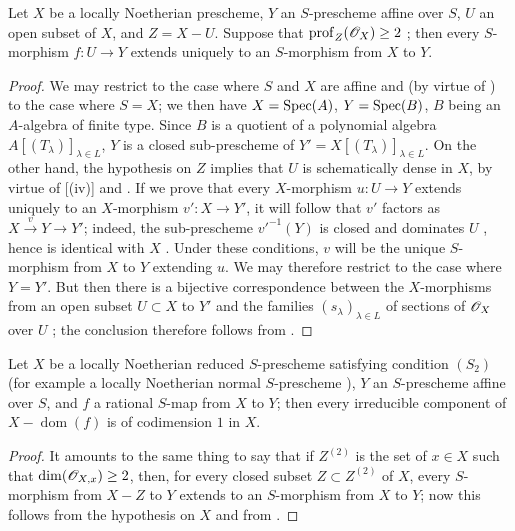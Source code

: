 \begin{proposition}[20.4.11]
\label{IV.20.4.11}
Let $X$ be a locally Noetherian prescheme, $Y$ an $S$-prescheme affine over $S$, $U$ an open subset of $X$, and $Z=X-U$.
Suppose that $\operatorname{prof}_Z(\mathscr{O}_X)\geq 2$ ; then every $S$-morphism $f:U\to Y$ extends uniquely to an $S$-morphism from $X$ to $Y$.
\end{proposition}

\begin{proof}
We may restrict to the case where $S$ and $X$ are affine and (by virtue of ) to the case where $S=X$; we then have $X=\operatorname{Spec}(A)$, $Y=\operatorname{Spec}(B)$, $B$ being an $A$-algebra of finite type.
Since $B$ is a quotient of a polynomial algebra $A[(T_\lambda)]_{\lambda\in L}$, $Y$ is a closed sub-prescheme of $Y'=X[(T_\lambda)]_{\lambda\in L}$.
On the other hand, the hypothesis on $Z$ implies that $U$ is schematically dense in $X$, by virtue of [(iv)] and .
If we prove that every $X$-morphism $u:U\to Y$ extends uniquely to an $X$-morphism $v':X\to Y'$, it will follow that $v'$ factors as $X\xrightarrow{v}Y\to Y'$; indeed, the sub-prescheme $v'^{-1}(Y)$ is closed and dominates $U$ , hence is identical with $X$ .
Under these conditions, $v$ will be the unique $S$-morphism from $X$ to $Y$ extending $u$.
We may therefore restrict to the case where $Y=Y'$.
But then there is a bijective correspondence between the $X$-morphisms from an open subset $U\subset X$ to $Y'$ and the families $(s_\lambda)_{\lambda\in L}$ of sections of $\mathscr{O}_X$ over $U$ ; the conclusion therefore follows from .
\end{proof}

\begin{corollary}[20.4.12]
\label{IV.20.4.12}
Let $X$ be a locally Noetherian reduced $S$-prescheme satisfying condition $(S_2)$  (for example a locally Noetherian normal $S$-prescheme ), $Y$ an $S$-prescheme affine over $S$, and $f$ a rational $S$-map from $X$ to $Y$; then every irreducible component of $X-\operatorname{dom}(f)$ is of codimension $1$ in $X$.
\end{corollary}

\begin{proof}
It amounts to the same thing to say that if $Z^{(2)}$ is the set of $x\in X$ such that $\dim(\mathscr{O}_{X,x})\geq 2$, then, for every closed subset $Z\subset Z^{(2)}$ of $X$, every $S$-morphism from $X-Z$ to $Y$ extends to an $S$-morphism from $X$ to $Y$; now this follows from the hypothesis on $X$  and from .
\end{proof}

